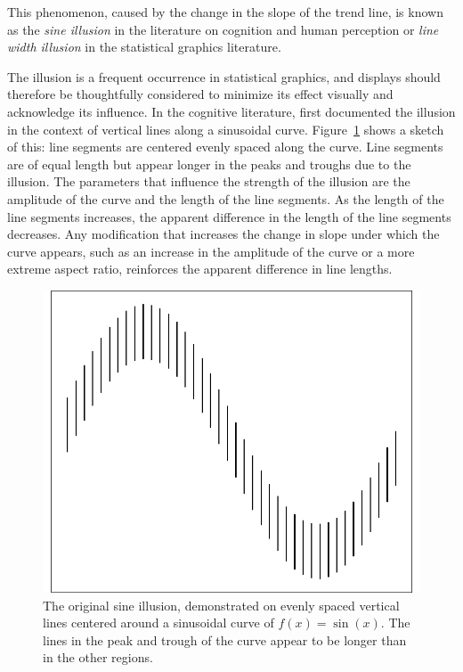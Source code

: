 \documentclass[11pt]{isuthesis}\usepackage[]{graphicx}\usepackage[]{color}
\newenvironment{knitrout}{}{} %
\begin{document}
This phenomenon, caused by the change in the slope of the trend line,  is  known as the  {\it sine illusion} in the literature on cognition and human perception  or {\it line width illusion} in the statistical graphics literature. 

The illusion is a frequent occurrence in statistical graphics, and  displays should therefore be thoughtfully considered to minimize its effect visually and acknowledge its influence. 
In the cognitive literature, \citet{day:1991} first documented the illusion in the context of vertical lines along a sinusoidal curve. Figure~\ref{fig:original} shows a sketch of this: line segments are centered evenly spaced along the curve. Line segments are of equal length but appear longer in the peaks and troughs due to the illusion. The parameters that influence the strength of the illusion are the amplitude of the curve and the length of the line segments. As the length of the line segments increases,  the apparent difference in the length of the line segments decreases. Any modification that increases the change in slope under which the curve appears, such as an increase in the amplitude of the curve or a more extreme aspect ratio, reinforces the apparent difference in line lengths. 





\begin{figure}[hbtp]
\centering
\begin{knitrout}
\color{fgcolor}

{\centering \includegraphics[width=.4\linewidth]{Figure/sineIllusion/fig-original-1} 

}



\end{knitrout}
\caption[The original sine illusion]{The original sine illusion, demonstrated on evenly spaced vertical lines centered around a sinusoidal curve of $f(x) = \sin(x)$. The lines in the peak and trough of the curve appear to be longer than in the other regions.\label{fig:original}}
\end{figure}
\end{document}
